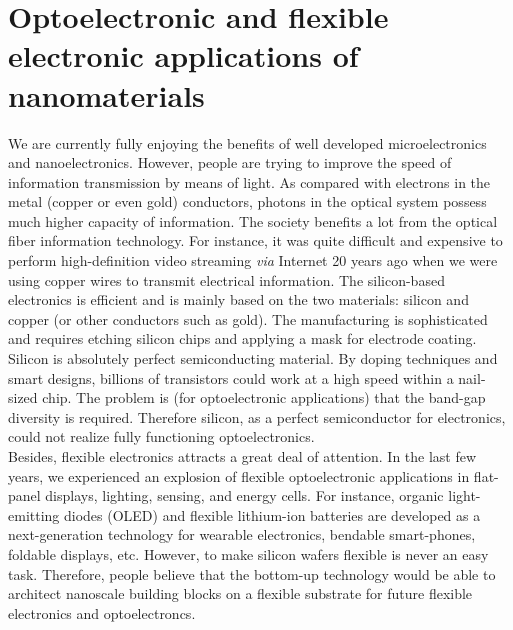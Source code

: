 \section{Optoelectronic and flexible electronic applications of nanomaterials}
We are currently fully enjoying the benefits of well developed microelectronics and nanoelectronics. However, people are trying to improve the speed of information transmission by means of light. As compared with electrons in the metal (copper or even gold) conductors, photons in the optical system possess much higher capacity of information. The society benefits a lot from the optical fiber information technology. For instance, it was quite difficult and expensive to perform high-definition video streaming \textit{via} Internet 20 years ago when we were using copper wires to transmit electrical information. 
The silicon-based electronics is efficient and is mainly based on the two materials: silicon and copper (or other conductors such as gold). The manufacturing is sophisticated and requires etching silicon chips and applying a mask for electrode coating. Silicon is absolutely perfect semiconducting material. By doping techniques and smart designs, billions of transistors could work at a high speed within a nail-sized chip. The problem is (for optoelectronic applications) that the band-gap diversity is required. Therefore silicon, as a perfect semiconductor for electronics, could not realize fully functioning optoelectronics. \\ 
Besides, flexible electronics attracts a great deal of attention. In the last few years, we experienced an explosion of flexible optoelectronic applications in flat-panel displays, lighting, sensing, and energy cells. For instance, organic light-emitting diodes (OLED) and flexible lithium-ion batteries are developed as a next-generation technology for wearable electronics, bendable smart-phones, foldable displays, etc. However, to make silicon wafers flexible is never an easy task. Therefore, people believe that the bottom-up technology would be able to architect nanoscale building blocks on a flexible substrate for future flexible electronics and optoelectroncs. \\

